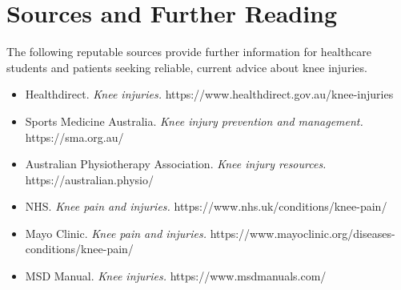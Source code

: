 \section*{Sources and Further Reading}
The following reputable sources provide further information for healthcare students and patients seeking reliable, current advice about knee injuries.
\begin{itemize}
    \item Healthdirect. \textit{Knee injuries.} https://www.healthdirect.gov.au/knee-injuries
    \item Sports Medicine Australia. \textit{Knee injury prevention and management.} https://sma.org.au/
    \item Australian Physiotherapy Association. \textit{Knee injury resources.} https://australian.physio/
    \item NHS. \textit{Knee pain and injuries.} https://www.nhs.uk/conditions/knee-pain/
    \item Mayo Clinic. \textit{Knee pain and injuries.} https://www.mayoclinic.org/diseases-conditions/knee-pain/
    \item MSD Manual. \textit{Knee injuries.} https://www.msdmanuals.com/
\end{itemize}
